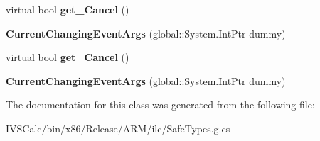 \begin{DoxyCompactItemize}
virtual bool {\bfseries get\+\_\+\+Cancel} ()
\item 
\mbox{\label{class_windows_1_1_u_i_1_1_xaml_1_1_data_1_1_current_changing_event_args_a7b09023b938fbdd79021a51b2a6b85f5}} 
{\bfseries Current\+Changing\+Event\+Args} (global\+::\+System.\+Int\+Ptr dummy)
\item 
\mbox{\label{class_windows_1_1_u_i_1_1_xaml_1_1_data_1_1_current_changing_event_args_a862992a26965fe2a9e9e850bc6712ba8}} 
virtual bool {\bfseries get\+\_\+\+Cancel} ()
\item 
\mbox{\label{class_windows_1_1_u_i_1_1_xaml_1_1_data_1_1_current_changing_event_args_a7b09023b938fbdd79021a51b2a6b85f5}} 
{\bfseries Current\+Changing\+Event\+Args} (global\+::\+System.\+Int\+Ptr dummy)
\end{DoxyCompactItemize}


The documentation for this class was generated from the following file\+:\begin{DoxyCompactItemize}
\item 
I\+V\+S\+Calc/bin/x86/\+Release/\+A\+R\+M/ilc/Safe\+Types.\+g.\+cs\end{DoxyCompactItemize}
